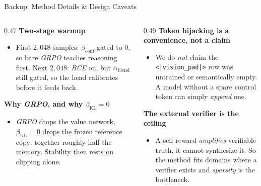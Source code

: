 \documentclass[aspectratio=169,10pt,t]{beamer}
\DeclareRobustCommand{\acit}[1]{\textit{\acs{#1}}}
\newcommand{\lead}[1]{{\color{jkunavy}\textbf{#1}}\par\vspace{1pt}}
\begin{document}
\begin{frame}[noframenumbering]{Backup: Method Details \& Design Caveats}
	\begin{columns}[T, onlytextwidth]
		\begin{column}{0.47\textwidth}
			\lead{Two-stage warmup}
			\begin{itemize}
				\item First $2{,}048$ samples: $\beta_{\mathrm{conf}}$ gated to $0$, so bare \acit{GRPO} teaches reasoning first. Next $2{,}048$: \acit{BCE} on, but $\alpha_{\mathrm{blend}}$ still gated, so the head calibrates before it feeds back.
			\end{itemize}
			\vspace{0.12cm}
			\lead{Why \acit{GRPO}, and why $\beta_{\mathrm{KL}}=0$}
			\begin{itemize}
				\item \acit{GRPO} drops the value network, $\beta_{\mathrm{KL}}=0$ drops the frozen reference copy: together roughly half the memory. Stability then rests on clipping alone.
			\end{itemize}
		\end{column}
		\begin{column}{0.49\textwidth}
			\lead{Token hijacking is a convenience, not a claim}
			\begin{itemize}
				\item We do \emph{not} claim the \texttt{<|vision\_pad|>} row was untrained or semantically empty. A model without a spare control token can simply \emph{append} one.
			\end{itemize}
			\vspace{0.12cm}
			\lead{The external verifier is the ceiling}
			\begin{itemize}
				\item A self-reward \emph{amplifies} verifiable truth, it cannot synthesize it. So the method fits domains where a verifier exists and \emph{sparsity} is the bottleneck.
			\end{itemize}
		\end{column}
	\end{columns}
\end{frame}
\end{document}
